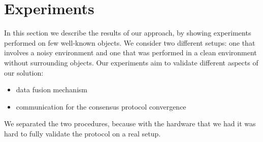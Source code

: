 \documentclass[10pt,conference,compsocconf]{IEEEtran}
\begin{document}
\section{Experiments}
In this section we describe the results of our approach, by showing experiments performed on few well-known objects. We consider two different setups: one that involves a noisy environment and one that was performed in a clean environment without surrounding objects.
Our experiments aim to validate different aspects of our solution:
\begin{itemize}
\item data fusion mechanism
\item communication for the consensus protocol convergence
\end{itemize}
We separated the two procedures, because with the hardware that we had it was hard to fully validate the protocol on a real setup.
\end{document}
